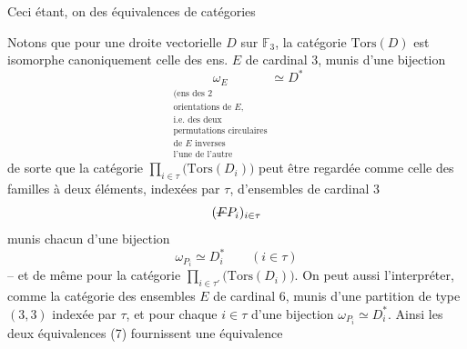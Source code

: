 Ceci étant, on  des équivalences de catégories


Notons que pour une droite vectorielle $D$ sur $\mathbb F_3$, la catégorie $\mathrm{Tors}(D)$ est isomorphe canoniquement  celle des ens. $E$ de cardinal $3$, munis d'une bijection
\[
\underset{\substack{\text{(ens des 2}\\\text{orientations de }E,\\
\text{i.e. des deux}\\\text{permutations circulaires}\\
\text{de }E\text{ inverses}\\\text{l'une de l'autre}}}{\omega_E}
 \simeq D^{*}
\]
de sorte que la catégorie $\prod_{i\in\tau}\bigl(\mathrm{Tors}(D_i)\bigr)$ peut être regardée comme celle des familles à deux éléments, indexées par $\tau$, d'ensembles de cardinal $3$
\[
(\deleted{F}P_i)_{i\in\tau}
\]
munis chacun d'une bijection
\[
\omega_{P_i}\simeq D_i^{*}\qquad(i\in\tau)
\]
-- et de même pour la catégorie $\prod_{i\in\tau'}\bigl(\mathrm{Tors}(D_i)\bigr)$.
On peut aussi l'interpréter,  comme la catégorie des ensembles $E$ de cardinal $6$, munis d'une partition  de type $(3,3)$ indexée par $\tau$, et pour chaque $i\in\tau$ d'une bijection $\omega_{P_i}\simeq D_i^*$. Ainsi les deux équivalences (7) fournissent une équivalence



